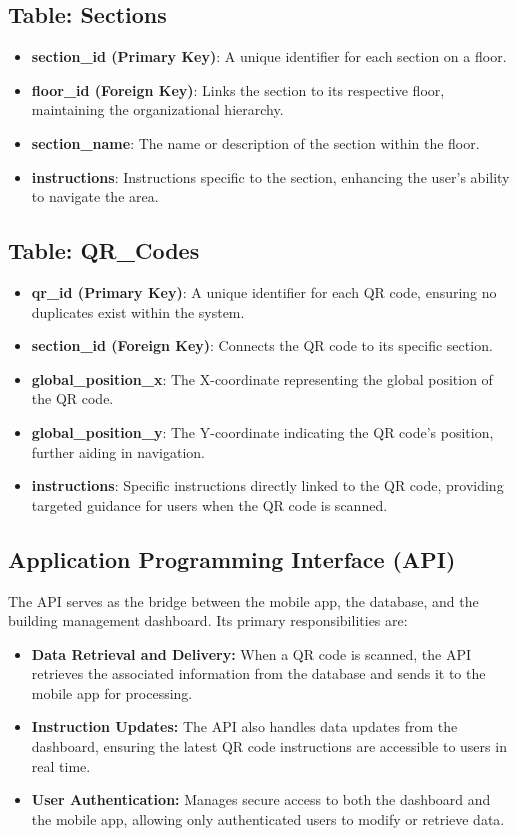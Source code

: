 \subsection{Table: Sections}  
\begin{itemize}
	\item \textbf{section\_id (Primary Key)}: A unique identifier for each section on a floor.
	\item \textbf{floor\_id (Foreign Key)}: Links the section to its respective floor, maintaining the organizational hierarchy.
	\item \textbf{section\_name}: The name or description of the section within the floor.
	\item \textbf{instructions}: Instructions specific to the section, enhancing the user’s ability to navigate the area.
\end{itemize}

\subsection{Table: QR\_Codes}  
\begin{itemize}
	\item \textbf{qr\_id (Primary Key)}: A unique identifier for each QR code, ensuring no duplicates exist within the system.
	\item \textbf{section\_id (Foreign Key)}: Connects the QR code to its specific section.
	\item \textbf{global\_position\_x}: The X-coordinate representing the global position of the QR code.
	\item \textbf{global\_position\_y}: The Y-coordinate indicating the QR code's position, further aiding in navigation.
	\item \textbf{instructions}: Specific instructions directly linked to the QR code, providing targeted guidance for users when the QR code is scanned.
\end{itemize}




\subsection{Application Programming Interface (API)}

The API serves as the bridge between the mobile app, the database, and the building management dashboard. Its primary responsibilities are:
\begin{itemize}
	\item \textbf{Data Retrieval and Delivery:} When a QR code is scanned, the API retrieves the associated information from the database and sends it to the mobile app for processing.
	\item \textbf{Instruction Updates:} The API also handles data updates from the dashboard, ensuring the latest QR code instructions are accessible to users in real time.
	\item \textbf{User Authentication:} Manages secure access to both the dashboard and the mobile app, allowing only authenticated users to modify or retrieve data.
\end{itemize}

